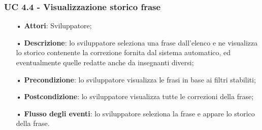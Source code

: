 \subsubsection{UC 4.4 - Visualizzazione storico frase}
\begin{itemize}
	\item[•]\textbf{Attori}: Sviluppatore;
	\item[•]\textbf{Descrizione}: lo sviluppatore seleziona una frase dall'elenco e ne visualizza lo storico contenente la correzione fornita dal sistema automatico, ed eventualmente quelle redatte anche da insegnanti diversi;
	\item[•]\textbf{Precondizione}: lo sviluppatore visualizza le frasi in base ai filtri stabiliti;
	\item[•]\textbf{Postcondizione}: lo sviluppatore visualizza tutte le correzioni della frase;
	\item[•]\textbf{Flusso degli eventi}: lo sviluppatore seleziona la frase e appare lo storico della frase.
\end{itemize}

